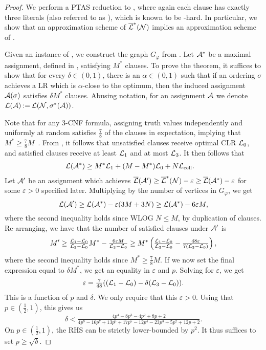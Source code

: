 \begin{proof}
    We perform a PTAS reduction to \maxsat, where again each clause has exactly three literals (also referred to as ), which is known to be \apx-hard.
    In particular, we show that an approximation scheme of $ \overline{\mathcal{L}}^*(\mathcal{N}) $ implies an approximation scheme of \maxsat{}.

    Given an instance of \maxsat, we construct the graph $ G_\varphi $ from .
    Let $ \mathcal{A}^* $ be a maximal assignment, defined in , satisfying $ M^* $ clauses.
    To prove the theorem, it suffices to show that for every $ \delta \in \left( 0,1 \right) $, there is an $ \alpha \in \left( 0,1 \right) $ such that if an ordering $ \sigma $ achieves a LR which is $ \alpha  $-close to the optimum, then the induced assignment $ \mathcal{A}(\sigma) $ satisfies $ \delta M^*$ clauses.
    Abusing notation, for an assignment $ \mathcal{A} $ we denote $ \mathcal{L}(\mathcal{A}) \mathbin{:=} \mathcal{L}(\mathcal{N},\sigma^*(\mathcal{A})) $.
    
    Note that for any 3-CNF formula, assigning truth values independently and uniformly at random satisfies $\frac 7 8$ of the clauses in expectation, implying that $ M^* \geq \frac 78 M $~\cite{Hastad2001-fg}. 
    From , it follows that unsatisfied clauses receive optimal CLR $ \mathcal{L}_0 $, and satisfied clauses receive at least $ \mathcal{L}_1 $ and at most $ \mathcal{L}_3 $.
    It then follows that \begin{align*}
         \mathcal{L}(\mathcal{A}^*)&\geq M^*\mathcal{L}_1+(M-M^*)\mathcal{L}_0+N \mathcal{L}_{\text{cell}}.
    \end{align*}
    Let $ \mathcal{A}' $ be an assignment which achieves $ \overline{\mathcal{L}}(\mathcal{A}') \geq \overline{\mathcal{L}}^*(\mathcal{N}) - \varepsilon \geq \overline{\mathcal{L}}(\mathcal{A}^*)  - \varepsilon $ for some $ \varepsilon > 0 $ specified later.
    Multiplying by the number of vertices in $ G_\varphi $, we get \[
        \mathcal{L}(\mathcal{A}') \geq \mathcal{L}(\mathcal{A}^*) - \varepsilon (3M+3N) \geq \mathcal{L}(\mathcal{A}^*) - 6\varepsilon M,
    \]
    where the second inequality holds since WLOG $ N \leq M $, by duplication of clauses.
    Re-arranging, we have that the number of satisfied clauses under $\mathcal{A}'$ is
    $$M'\geq \tfrac{\mathcal{L}_1 - \mathcal{L}_0}{\mathcal{L}_3 - \mathcal{L}_0}M^*-\tfrac{6\varepsilon M}{\mathcal{L}_3 - \mathcal{L}_0} \geq M^*\left( \tfrac{\mathcal{L}_1 - \mathcal{L}_0}{\mathcal{L}_3 - \mathcal{L}_0}-\tfrac{48\varepsilon}{7(\mathcal{L}_3 - \mathcal{L}_0)}\right), $$
    where the second inequality holds since $M^*\geq \frac 78 M$.
    If we now set the final expression equal to $ \delta M^* $, we get an equality in $ \varepsilon $ and $ p $.
    Solving for $ \varepsilon $, we get
    \begin{equation}\label{eq:eps}
        \varepsilon=\tfrac{7}{48}( (\mathcal{L}_1 - \mathcal{L}_0)-\delta(\mathcal{L}_3 - \mathcal{L}_0)).
    \end{equation}
    This is a function of $ p $ and $ \delta $. 
    We only require that this $\varepsilon > 0$.
    Using that $p \in (\frac 12,1)$, this gives us \[
    \delta < \tfrac{4 p^4-8 p^3-4 p^2+8 p+2}{4 p^8-16 p^7+13 p^6+17 p^5-12 p^4-23 p^3+5 p^2+12 p+2}.
    \]
    On $p \in (\frac 12, 1)$, the RHS can be strictly lower-bounded by $p^2$. It thus suffices to set $p \geq \sqrt \delta$.
    

\end{proof}
